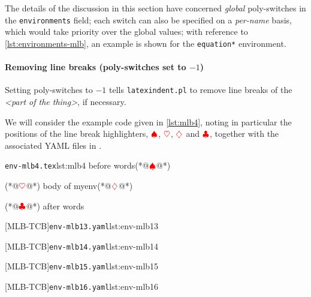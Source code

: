  The details of the discussion in this section have concerned \emph{global}
  poly-switches in the \texttt{environments} field; each switch can also be specified on
  a \emph{per-name} basis, which would take priority over the global values; with
  reference to \vref{lst:environments-mlb}, an example is shown for the
  \texttt{equation*} environment.

 \paragraph{Removing line breaks (poly-switches set to $-1$)}
  Setting poly-switches to $-1$ tells \texttt{latexindent.pl} to remove line breaks of
  the \emph{<part of the thing>}, if necessary.

  \begin{example}
  We will consider the example code given in \cref{lst:mlb4}, noting in particular the
  positions of the line break highlighters, $\color{red}\spadesuit$,
  $\color{red}\heartsuit$, $\color{red}\diamondsuit$ and $\color{red}\clubsuit$, together
  with the associated YAML files in .

  \begin{minipage}{.45\linewidth}
   \begin{cmhlistings}[style=tcblatex,escapeinside={(*@}{@*)}]{\texttt{env-mlb4.tex}}{lst:mlb4}
before words(*@$\color{red}\spadesuit$@*)
\begin{myenv}(*@$\color{red}\heartsuit$@*)
body of myenv(*@$\color{red}\diamondsuit$@*)
\end{myenv}(*@$\color{red}\clubsuit$@*)
after words
\end{cmhlistings}
  \end{minipage}%
  \hfill
  \begin{minipage}{.51\textwidth}
   [MLB-TCB]{\texttt{env-mlb13.yaml}}{lst:env-mlb13}

   [MLB-TCB]{\texttt{env-mlb14.yaml}}{lst:env-mlb14}

   [MLB-TCB]{\texttt{env-mlb15.yaml}}{lst:env-mlb15}

   [MLB-TCB]{\texttt{env-mlb16.yaml}}{lst:env-mlb16}
  \end{minipage}


\end{example}
